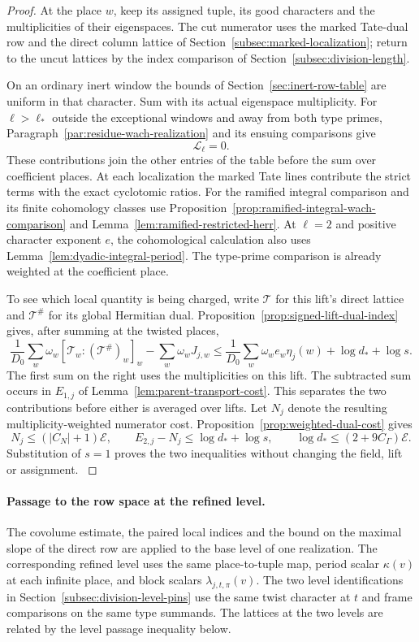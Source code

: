 \begin{proof}
At the place \(w\), keep its assigned tuple, its good characters
and the multiplicities of their eigenspaces. The cut numerator
uses the marked Tate-dual row and the direct column lattice of
Section~\ref{subsec:marked-localization}; return to the uncut
lattices by the index comparison of Section~\ref{subsec:division-length}.

On an ordinary inert window the
bounds of Section~\ref{sec:inert-row-table} are uniform in
that character. Sum with its actual eigenspace multiplicity.
For \(\ell>\ell_*\) outside the exceptional windows and away from both type primes, Paragraph~\ref{par:residue-wach-realization} and its ensuing comparisons give
\[
                  \mathcal L_\ell=0 .
\] These contributions
join the other entries of the table before the sum over
coefficient places. At each localization the marked Tate lines
contribute the strict terms with the exact cyclotomic ratios.
For the ramified integral comparison and its finite cohomology classes use Proposition~\ref{prop:ramified-integral-wach-comparison} and Lemma~\ref{lem:ramified-restricted-herr}. At \(\ell=2\) and positive character exponent \(e\), the cohomological calculation also uses Lemma~\ref{lem:dyadic-integral-period}. The type-prime comparison is already weighted at the coefficient place.

To see which local quantity is being charged, write \(\mathcal T\) for this lift's direct lattice and \(\mathcal T^\#\) for its global Hermitian dual. Proposition~\ref{prop:signed-lift-dual-index} gives, after summing at the twisted places,
\[
 \frac1{D_0}\sum_w\omega_w[\mathcal T_w:(\mathcal T^\#)_w]_w
 -\sum_w\omega_w J_{j,w}
 \le \frac1{D_0}\sum_w\omega_w e_w\eta_j(w)
                 +\log d_*+\log s .
\]
The first sum on the right uses the multiplicities on this lift. The subtracted sum occurs in \(E_{1,j}\) of Lemma~\ref{lem:parent-transport-cost}. This separates the two contributions before either is averaged over lifts. Let \(N_j\) denote the resulting multiplicity-weighted numerator cost. Proposition~\ref{prop:weighted-dual-cost} gives
\[
 N_j\le(|C_N|+1)\mathcal E,\qquad
 E_{2,j}-N_j\le\log d_*+\log s,\qquad
 \log d_*\le(2+9C_\Gamma)\mathcal E .
\]
Substitution of \(s=1\) proves the two inequalities without
changing the field, lift or assignment.
\label{cor:word-division-2}
\end{proof}

\paragraph{Passage to the row space at the refined level.}
The covolume estimate, the paired local indices and the bound
on the maximal slope of the direct row are applied to the
base level of one realization. The corresponding refined level
uses the same place-to-tuple map, period scalar \(\kappa(v)\)
at each infinite place, and block scalars \(\lambda_{j,t,\pi}(v)\).
The two level identifications in
Section~\ref{subsec:division-level-pins} use the same
twist character at \(t\) and frame comparisons on the same
type summands. The lattices at the two levels are related
by the level passage inequality below.
\label{cor:word-division-3}

